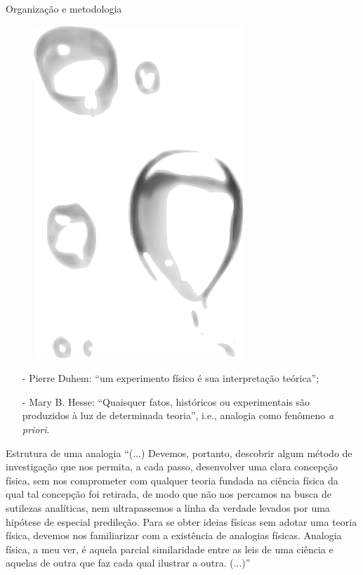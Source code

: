\documentclass[aspectratio=169]{beamer}
\begin{document}
\begin{frame}{Organização e metodologia}
\begin{minipage}{0.4\textwidth}
	\begin{figure}
		\centering
		\includegraphics[scale=0.2]{figuras/gota-dagua.pdf}
	\end{figure}
\end{minipage}
\begin{itemize}
	\item[-] Pierre Duhem:\cite{duhem1954} ``um experimento físico é sua interpretação teórica'';
	\item[-] Mary B. Hesse:\cite{hesse1962} ``Quaisquer fatos, históricos ou experimentais são produzidos à luz de determinada teoria'', i.e., analogia como fenômeno \emph{a priori}.
\end{itemize}
\end{frame}

\begin{frame}{Estrutura de uma analogia}
``(...) Devemos, portanto, descobrir algum método de investigação que nos permita, a cada passo, desenvolver uma clara concepção física, sem nos comprometer com qualquer teoria fundada na ciência física da qual tal concepção foi retirada, de modo que não nos percamos na busca de sutilezas analíticas, nem ultrapassemos a linha da verdade levados por uma hipótese de especial predileção. Para se obter ideias físicas sem adotar uma teoria física, devemos nos familiarizar com a existência de analogias físicas. Analogia física, a meu ver, é aquela parcial similaridade entre as leis de uma ciência e aquelas de outra que faz cada qual ilustrar a outra. (...)''\cite{maxwell1855} 
\end{frame}
\end{document}
